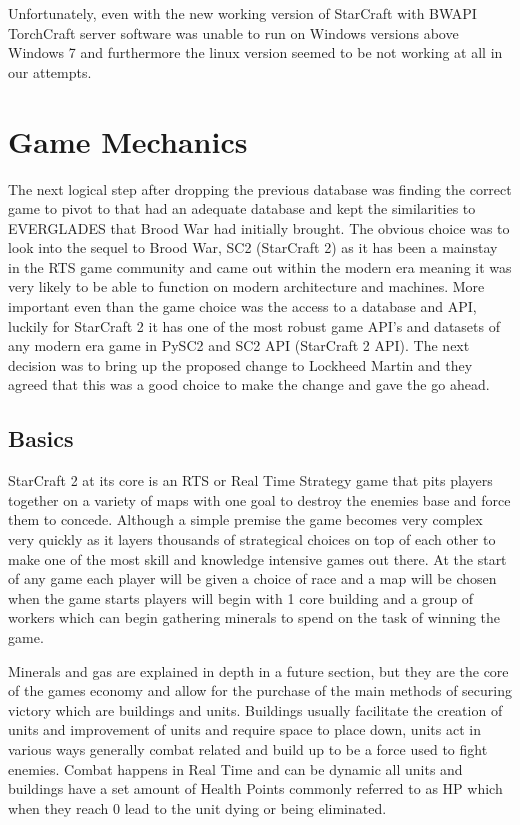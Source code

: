 \documentclass[a4paper,12pt]{report}
\begin{document}
Unfortunately, even with the new working version of StarCraft with BWAPI TorchCraft server software was unable to run on Windows versions above Windows 7 and furthermore the linux version seemed to be not working at all in our attempts.

\section{Game Mechanics}

The next logical step after dropping the previous database was finding the correct game to pivot to that had an adequate database and kept the similarities to EVERGLADES that Brood War had initially brought. The obvious choice was to look into the sequel to Brood War, SC2 (StarCraft 2) as it has been a mainstay in the RTS game community and came out within the modern era meaning it was very likely to be able to function on modern architecture and machines. More important even than the game choice was the access to a database and API, luckily for StarCraft 2 it has one of the most robust game API’s and datasets of any modern era game in PySC2 and SC2 API (StarCraft 2 API). The next decision was to bring up the proposed change to Lockheed Martin and they agreed that this was a good choice to make the change and gave the go ahead.

\subsection{Basics}

StarCraft 2 at its core is an RTS or Real Time Strategy game that pits players together on a variety of maps with one goal to destroy the enemies base and force them to concede. Although a simple premise the game becomes very complex very quickly as it layers thousands of strategical choices on top of each other to make one of the most skill and knowledge intensive games out there. At the start of any game each player will be given a choice of race and a map will be chosen when the game starts players will begin with 1 core building and a group of workers which can begin gathering minerals to spend on the task of winning the game.

Minerals and gas are explained in depth in a future section, but they are the core of the games economy and allow for the purchase of the main methods of securing victory which are buildings and units. Buildings usually facilitate the creation of units and improvement of units and require space to place down, units act in various ways generally combat related and build up to be a force used to fight enemies. Combat happens in Real Time and can be dynamic all units and buildings have a set amount of Health Points commonly referred to as HP which when they reach 0 lead to the unit dying or being eliminated.
\end{document}
